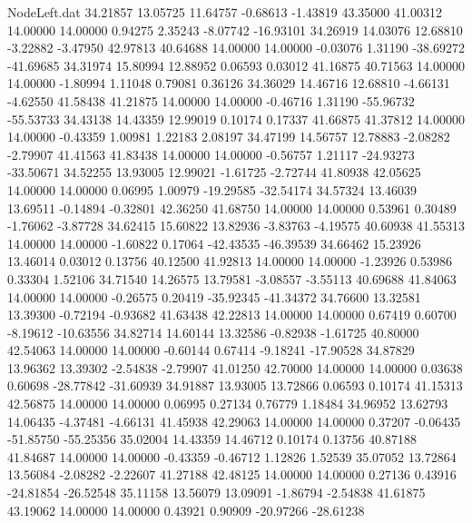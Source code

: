 \begin{filecontents}{NodeLeft.dat}
  34.21857   13.05725   11.64757    -0.68613   -1.43819   43.35000   41.00312   14.00000   14.00000    0.94275    2.35243   -8.07742  -16.93101
  34.26919   14.03076   12.68810    -3.22882   -3.47950   42.97813   40.64688   14.00000   14.00000   -0.03076    1.31190  -38.69272  -41.69685
  34.31974   15.80994   12.88952     0.06593    0.03012   41.16875   40.71563   14.00000   14.00000   -1.80994    1.11048    0.79081    0.36126
  34.36029   14.46716   12.68810    -4.66131   -4.62550   41.58438   41.21875   14.00000   14.00000   -0.46716    1.31190  -55.96732  -55.53733
  34.43138   14.43359   12.99019     0.10174    0.17337   41.66875   41.37812   14.00000   14.00000   -0.43359    1.00981    1.22183    2.08197
  34.47199   14.56757   12.78883    -2.08282   -2.79907   41.41563   41.83438   14.00000   14.00000   -0.56757    1.21117  -24.93273  -33.50671
  34.52255   13.93005   12.99021    -1.61725   -2.72744   41.80938   42.05625   14.00000   14.00000    0.06995    1.00979  -19.29585  -32.54174
  34.57324   13.46039   13.69511    -0.14894   -0.32801   42.36250   41.68750   14.00000   14.00000    0.53961    0.30489   -1.76062   -3.87728
  34.62415   15.60822   13.82936    -3.83763   -4.19575   40.60938   41.55313   14.00000   14.00000   -1.60822    0.17064  -42.43535  -46.39539
  34.66462   15.23926   13.46014     0.03012    0.13756   40.12500   41.92813   14.00000   14.00000   -1.23926    0.53986    0.33304    1.52106
  34.71540   14.26575   13.79581    -3.08557   -3.55113   40.69688   41.84063   14.00000   14.00000   -0.26575    0.20419  -35.92345  -41.34372
  34.76600   13.32581   13.39300    -0.72194   -0.93682   41.63438   42.22813   14.00000   14.00000    0.67419    0.60700   -8.19612  -10.63556
  34.82714   14.60144   13.32586    -0.82938   -1.61725   40.80000   42.54063   14.00000   14.00000   -0.60144    0.67414   -9.18241  -17.90528
  34.87829   13.96362   13.39302    -2.54838   -2.79907   41.01250   42.70000   14.00000   14.00000    0.03638    0.60698  -28.77842  -31.60939
  34.91887   13.93005   13.72866     0.06593    0.10174   41.15313   42.56875   14.00000   14.00000    0.06995    0.27134    0.76779    1.18484
  34.96952   13.62793   14.06435    -4.37481   -4.66131   41.45938   42.29063   14.00000   14.00000    0.37207   -0.06435  -51.85750  -55.25356
  35.02004   14.43359   14.46712     0.10174    0.13756   40.87188   41.84687   14.00000   14.00000   -0.43359   -0.46712    1.12826    1.52539
  35.07052   13.72864   13.56084    -2.08282   -2.22607   41.27188   42.48125   14.00000   14.00000    0.27136    0.43916  -24.81854  -26.52548
  35.11158   13.56079   13.09091    -1.86794   -2.54838   41.61875   43.19062   14.00000   14.00000    0.43921    0.90909  -20.97266  -28.61238

\end{filecontents}
